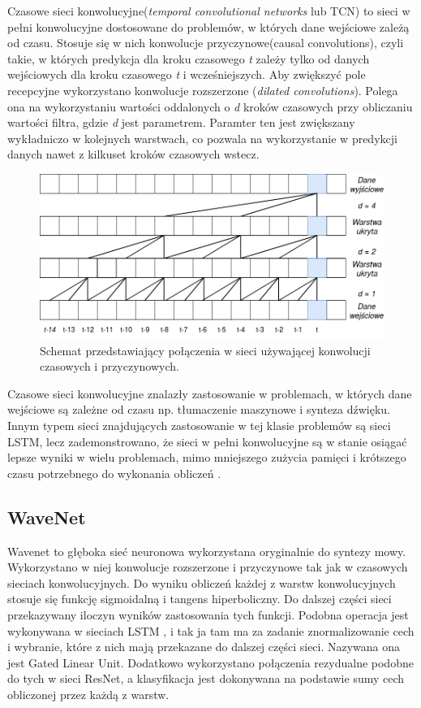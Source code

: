 \documentclass[a4paper,11pt,twoside]{report}
\theoremstyle{definition}
\begin{document}
Czasowe sieci konwolucyjne(\textit{temporal convolutional networks} lub TCN) to sieci w pełni konwolucyjne dostosowane do problemów, w których dane wejściowe zależą od czasu. Stosuje się w nich konwolucje przyczynowe(causal convolutions), czyli takie, w których predykcja dla kroku czasowego \textit{t} zależy tylko od danych wejściowych dla kroku czasowego \textit{t} i wcześniejszych. Aby zwiększyć pole recepcyjne wykorzystano konwolucje rozszerzone (\textit{dilated convolutions}). Polega ona na wykorzystaniu wartości oddalonych o \textit{d} kroków czasowych przy obliczaniu wartości filtra, gdzie \textit{d} jest parametrem. Paramter ten jest zwiększany wykładniczo w kolejnych warstwach, co pozwala na wykorzystanie w predykcji danych nawet z kilkuset kroków czasowych wstecz.

\begin{figure}[h!]
	\centering
	\includegraphics[scale=0.5]{tcn}
	\caption{Schemat przedstawiający połączenia w sieci używającej konwolucji czasowych i przyczynowych.}
\end{figure}

Czasowe sieci konwolucyjne znalazły zastosowanie w problemach, w których dane wejściowe są zależne od czasu np. tłumaczenie maszynowe\cite{fcnTranslation} i synteza dźwięku. Innym typem sieci znajdujących zastosowanie w tej klasie problemów są sieci LSTM\cite{lstm}, lecz zademonstrowano, że sieci w pełni konwolucyjne są w stanie osiągać lepsze wyniki w wielu problemach, mimo mniejszego zużycia pamięci i krótszego czasu potrzebnego do wykonania obliczeń \cite{sequenceModelling}.

\subsection{WaveNet}

Wavenet to głęboka sieć neuronowa wykorzystana oryginalnie do syntezy mowy\cite{wavenet}. Wykorzystano w niej konwolucje rozszerzone i przyczynowe tak jak w czasowych sieciach konwolucyjnych. Do wyniku obliczeń każdej z warstw konwolucyjnych stosuje się funkcję sigmoidalną i tangens hiperboliczny. Do dalszej części sieci przekazywany iloczyn wyników zastosowania tych funkcji. Podobna operacja jest wykonywana w sieciach LSTM \cite{lstm}, i tak ja tam ma za zadanie znormalizowanie cech i wybranie, które z nich mają przekazane do dalszej części sieci. Nazywana ona jest Gated Linear Unit\cite{glu}. Dodatkowo wykorzystano połączenia rezydualne podobne do tych w sieci ResNet\cite{resnet}, a klasyfikacja jest dokonywana na podstawie sumy cech obliczonej przez każdą z warstw.
\end{document}
